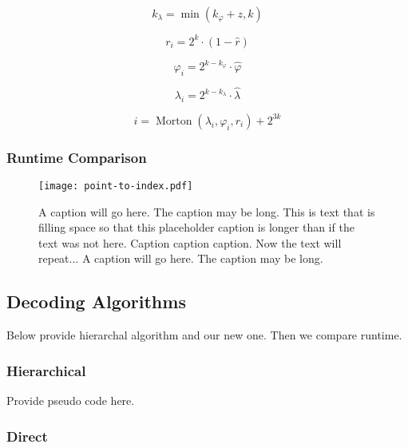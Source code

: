 \begin{equation*}
k_\lambda = \min ( k_\varphi + z, k )
\end{equation*}

\begin{equation*}
r_i = 2^k \cdot ( 1 - \hat{r} )
\end{equation*}

\begin{equation*}
\varphi_i = 2^{k - k_\varphi} \cdot \hat{\varphi}
\end{equation*}

\begin{equation*}
\lambda_i = 2^{k - k_\lambda} \cdot \hat{\lambda}
\end{equation*}

\begin{equation*}
i = \operatorname{Morton}( \lambda_i, \varphi_i, r_i ) + 2^{3k}
\end{equation*}


\subsubsection{Runtime Comparison}


\begin{figure}[htp!]
	\centering
	\texttt{[image: point-to-index.pdf]}
	\caption[Runtime comparison of SDOG point encoding algorithms]{
		A caption will go here.
		The caption may be long.
		This is text that is filling space so that this placeholder caption is longer than if the text was not here.
		Caption caption caption.
		Now the text will repeat...
		A caption will go here.
		The caption may be long.
	}
	\label{fig:point-to-index}
\end{figure}


\subsection{Decoding Algorithms}
Below provide hierarchal algorithm and our new one.
Then we compare runtime.

\subsubsection{Hierarchical}
Provide pseudo code here.

\subsubsection{Direct}

